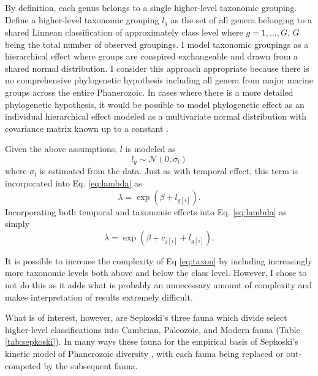 \documentclass[12pt,letterpaper]{article}
\begin{document}
By definition, each genus belongs to a single higher-level taxonomic grouping. Define a higher-level taxonomic grouping \(l_{g}\) as the set of all genera belonging to a shared Linnean classification of approximately class level where \(g = 1, \dots, G\), \(G\) being the total number of observed groupings. I model taxonomic groupings as a hierarchical effect where groups are conspired exchangeable and drawn from a shared normal distribution. I consider this approach appropriate because there is no comprehensive phylogenetic hypothesis including all genera from major marine groups across the entire Phanerozoic. In cases where there is a more detailed phylogenetic hypothesis, it would be possible to model phylogenetic effect as an individual hierarchical effect modeled as a multivariate normal distribution with covariance matrix known up to a constant \citep{Lynch1991,Housworth2004}.

Given the above assumptions, \(l\) is modeled as
\begin{equation}
  l_{g} \sim \mathcal{N}(0, \sigma_{l})
  \label{eq:taxon}
\end{equation}
where \(\sigma_{l}\) is estimated from the data. Just as with temporal effect, this term is incorporated into Eq. \ref{eq:lambda} as
\begin{equation}
  \lambda = \exp(\beta + l_{g[i]}).
  \label{eq:lambda_taxon}
\end{equation}
Incorporating both temporal and taxonomic effects into Eq. \ref{eq:lambda} as simply
\begin{equation}
  \lambda = \exp(\beta + c_{j[i]} + l_{g[i]}).
  \label{eq:lambda_full}
\end{equation}

It is possible to increase the complexity of Eq \ref{eq:taxon} by including increasingly more taxonomic levels both above and below the class level. However, I chose to not do this as it adds what is probably an unnecessary amount of complexity and makes interpretation of results extremely difficult.

What is of interest, however, are Sepkoski's three fauna \citep{SepkoskiJr.1981a} which divide select higher-level classifications into Cambrian, Paleozoic, and Modern fauna (Table \ref{tab:sepkoski}). In many ways these fauna for the empirical basis of Sepkoski's kinetic model of Phanerozoic diversity \citep{Sepkoski1978,Sepkoski1979,Sepkoski1984}, with each fauna being replaced or out-competed by the subsequent fauna. %
\end{document}
